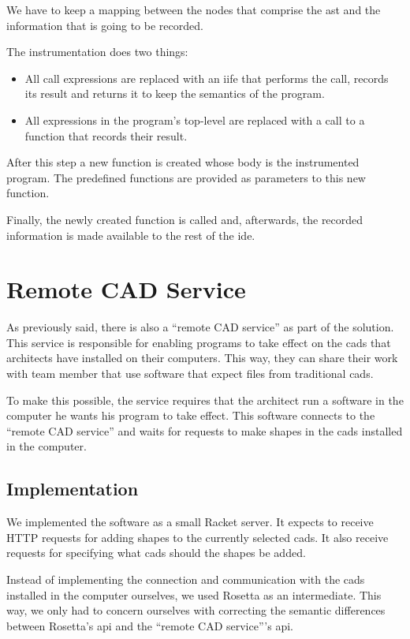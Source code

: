 We have to keep a mapping between the nodes that comprise the \gls{ast} and the information that is going to be recorded.

The instrumentation does two things:
\begin{itemize}
  \item All call expressions are replaced with an \gls{iife} that performs the call, records its result and returns it to keep the semantics of the program.
  \item All expressions in the program's top-level are replaced with a call to a function that records their result.
\end{itemize}

After this step a new function is created whose body is the instrumented program.
The predefined functions are provided as parameters to this new function.

Finally, the newly created function is called and, afterwards, the recorded information is made available to the rest of the \gls{ide}.


\section{Remote CAD Service}
As previously said, there is also a ``remote CAD service'' as part of the solution.
This service is responsible for enabling programs to take effect on the \glspl{cad} that architects have installed on their computers.
This way, they can share their work with team member that use software that expect files from traditional \glspl{cad}.

To make this possible, the service requires that the architect run a software in the computer he wants his program to take effect.
This software connects to the ``remote CAD service'' and waits for requests to make shapes in the \glspl{cad} installed in the computer.

\subsection{Implementation}
We implemented the software as a small Racket server.
It expects to receive HTTP requests for adding shapes to the currently selected \glspl{cad}.
It also receive requests for specifying what \glspl{cad} should the shapes be added.

Instead of implementing the connection and communication with the \glspl{cad} installed in the computer ourselves, we used Rosetta as an intermediate.
This way, we only had to concern ourselves with correcting the semantic differences between Rosetta's \gls{api} and the ``remote CAD service'''s \gls{api}.

